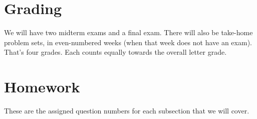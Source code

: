 \documentclass{article}
\begin{document}
\section{Grading}
We will have two midterm exams and a final exam.  
There will also be take-home problem sets, 
in even-numbered weeks (when that week does
not have an exam).
That's four grades.
Each counts equally towards the overall letter grade.



\gradedisclaimer %


\clearpage
\section{Homework}
These are the assigned question numbers for each subsection that we will cover.
\end{document}
